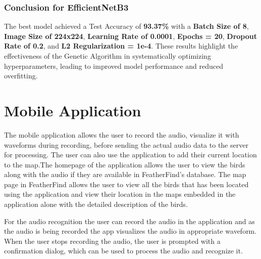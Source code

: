   
  
\subsubsection{Conclusion for EfficientNetB3}
The best model achieved a Test Accuracy of \textbf{93.37\%} with a \textbf{Batch Size of 8}, \textbf{Image Size of 224x224}, \textbf{Learning Rate of 0.0001}, \textbf{Epochs = 20}, \textbf{Dropout Rate of 0.2}, and \textbf{L2 Regularization = 1e-4}. These results highlight the effectiveness of the Genetic Algorithm in systematically optimizing hyperparameters, leading to improved model performance and reduced overfitting.

\section{Mobile Application}
The mobile application allows the user to record the audio, visualize it with
waveforms during recording, before sending the actual audio data to the server
for processing. The user can also use the application to add their current
location to the map.The homepage of the application allows the user to view the birds along with 
the audio if they are available in FeatherFind's database.
The map page in FeatherFind allows the user to view all the birds that has been located
using the application and view their location in the maps embedded in the application alone 
with the detailed description of the birds.

For the audio recognition the user can record the audio in the application and as the 
audio is being recorded the app visualizes the audio in appropriate waveform. When the user stops
recording the audio, the user is prompted with a confirmation dialog, which can be used to process the 
audio and recognize it.

